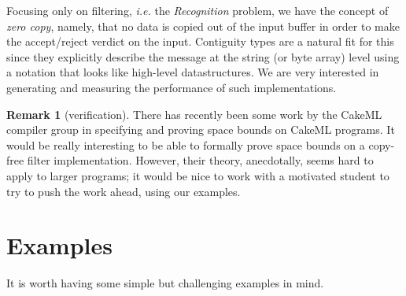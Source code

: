 \documentclass{article}
\newcommand{\ie}{\textit{i.e.}}
\theoremstyle{definition}
\newtheorem*{remark}{Remark}
\begin{document}
Focusing only on filtering, \ie{} the \emph{Recognition} problem, we
have the concept of \emph{zero copy}, namely, that no data is copied
out of the input buffer in order to make the accept/reject verdict on
the input. Contiguity types are a natural fit for this since they
explicitly describe the message at the string (or byte array) level
using a notation that looks like high-level datastructures. We are
very interested in generating and measuring the performance of such
implementations.

\begin{remark} [verification]
There has recently been some work by the CakeML compiler group in
specifying and proving space bounds on CakeML programs. It would be
really interesting to be able to formally prove space bounds on a
copy-free filter implementation. However, their theory, anecdotally,
seems hard to apply to larger programs; it would be nice to work with
a motivated student to try to push the work ahead, using our examples.
\end{remark}


\section{Examples}

It is worth having some simple but challenging examples in mind.
\end{document}
